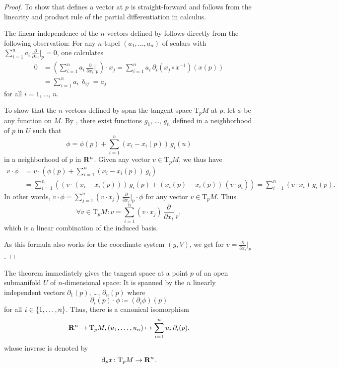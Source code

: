 \begin{proof}
  To show that  defines a vector at $p$ is
  straight-forward and follows from the linearity and product rule of the
  partial differentiation in calculus.
  
  The linear independence of the $n$ vectors defined by
   follows directly from the following
  observation: For any $n$-tupel $(a_1, \dotsc, a_n)$ of
  scalars with $\sum_{i = 1}^n a_i \, \frac\partial{\partial x_i}|_p = 0$, one
  calculates
  \[
    \begin{split}
      0 & = \left(\sum_{i = 1}^n a_i \, \frac\partial{\partial x_i}|_p\right) \cdot x_j
      = \sum_{i = 1}^n a_i \, \partial_i (x_j \circ x^{-1}) (x(p)) \\
      & = \sum_{i = 1}^n a_i \, \updelta_{ij}
      = a_j
    \end{split}
  \]
  for all $i = 1$, \dots, $n$.
  
  To show that the $n$ vectors defined by  span
  the tangent space $\mathrm T_p M$ at $p$, let $\phi$ be any function on $M$. By
  , there exist functions $g_1$, \dots, $g_n$ defined
  in a neighborhood of $p$ in $U$ such that
  \[
    \phi = \phi(p) + \sum_{i = 1}^n (x_i - x_i(p)) \, g_i(u)
  \]
  in a neighborhood of $p$ in $\mathbf{R}^n$. Given any vector $v \in
  \mathrm T_p M$, we thus have
  \[
    \begin{split}
      v \cdot \phi & = v \cdot (\phi(p) + \sum_{i = 1}^n (x_i - x_i(p)) \, g_i) \\
      & = \sum_{i = 1}^n \left((v \cdot (x_i - x_i(p))) \, g_i(p) + (x_i(p) - x_i(p)) \, (v \cdot g_i)\right)
      = \sum_{i = 1}^n (v \cdot x_i) \, g_i(p).
    \end{split}
  \]
  In other words, $v \cdot \phi = \sum_{j = 1}^n (v \cdot x_j) \, \frac\partial{\partial x_j}|_p \cdot \phi$
  for any vector $v \in \mathrm T_p M$. Thus
  \[
    \forall v \in \mathrm T_p M: v = \sum_{i = 1}^n (v \cdot x_j) \, \frac\partial{\partial x_i}|_p,
  \] 
  which is a linear combination of the induced basis.
  
  As this formula also works for the coordinate system $(y, V)$, we get
   for $v = \frac\partial{\partial x_i}|_p$.
\end{proof}

The theorem immediately gives the tangent space at a point $p$ of an open
submanifold $U$ of $n$-dimensional space: It is spanned by the $n$ linearly 
independent vectors $\partial_1(p)$, \dots, $\partial_n(p)$ where
\[
  \partial_i(p) \cdot \phi \coloneqq (\partial_i \phi) (p)
\]
for all $i \in \lbrace1, \dotsc, n\rbrace$. Thus, there is a canonical isomorphism
\[
  \mathbf{R}^n \to \mathrm T_p M,
  (u_1, \dotsc, u_n) \mapsto \sum_{i = 1}^n u_i \, \partial_i(p).
\]
whose inverse is denoted by
\[
  \mathrm d_p x\colon \mathrm T_p M \to \mathbf{R}^n.
\]

